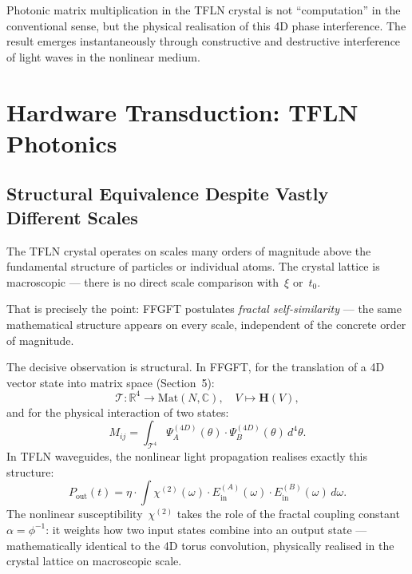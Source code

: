 Photonic matrix multiplication in the TFLN crystal is not ``computation''
in the conventional sense, but the physical realisation of this 4D phase
interference. The result emerges instantaneously through constructive
and destructive interference of light waves in the nonlinear medium.

\section{Hardware Transduction: TFLN Photonics}

\subsection{Structural Equivalence Despite Vastly Different Scales}

\begin{warnbox}
The TFLN crystal operates on scales many orders of magnitude above
the fundamental structure of particles or individual atoms. The
crystal lattice is macroscopic — there is no direct scale comparison
with~$\xi$ or~$t_0$.

That is precisely the point: FFGFT postulates \emph{fractal
self-similarity} — the same mathematical structure appears on every
scale, independent of the concrete order of magnitude.
\end{warnbox}

The decisive observation is structural. In FFGFT, for the translation
of a 4D vector state into matrix space (Section~5):
\begin{equation}
  \mathcal{T}: \mathbb{R}^4 \to \mathrm{Mat}(N,\mathbb{C}),\quad
  V \mapsto \mathbf{H}(V),
\end{equation}
and for the physical interaction of two states:
\begin{equation}
  M_{ij} = \int_{\mathcal{T}^4}
    \Psi_A^{(4D)}(\theta)\cdot\Psi_B^{(4D)}(\theta)\,d^4\theta.
\end{equation}
In TFLN waveguides, the nonlinear light propagation realises exactly
this structure:
\begin{equation}
  P_{\text{out}}(t)
  = \eta \cdot \int \chi^{(2)}(\omega)
    \cdot E_{\text{in}}^{(A)}(\omega)
    \cdot E_{\text{in}}^{(B)}(\omega)\,d\omega.
\end{equation}
The nonlinear susceptibility~$\chi^{(2)}$ takes the role of the fractal
coupling constant~$\alpha = \phi^{-1}$: it weights how two input states
combine into an output state — mathematically identical to the 4D torus
convolution, physically realised in the crystal lattice on macroscopic
scale.

